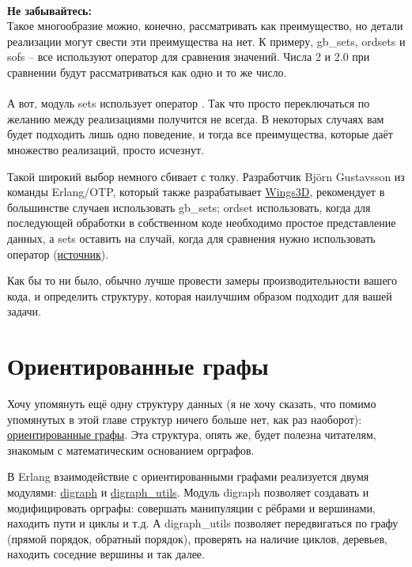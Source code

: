 \\
\colorbox{lorange}
{
    \begin{minipage}{1.0\linewidth}
        \textbf{Не забывайтесь:}\\
        Такое многообразие можно, конечно, рассматривать как преимущество, но детали реализации могут свести эти преимущества на нет.
        К примеру, gb\_sets, ordsets и sofs \--- все используют оператор \ops{==} для сравнения значений.
        Числа 2 и 2.0 при сравнении будут рассматриваться как одно и то же число.\\
        \\
        А вот, модуль sets использует оператор \ops{=:=}.
        Так что просто переключаться по желанию между реализациями получится не всегда.
        В некоторых случаях вам будет подходить лишь одно поведение, и тогда все преимущества, которые даёт множество реализаций, просто исчезнут.
    \end{minipage}
}

Такой широкий выбор немного сбивает с толку.
Разработчик Bj\"{o}rn Gustavsson из команды Erlang/OTP, который также разрабатывает \href{http://www.wings3d.com/}{Wings3D}, рекомендует в большинстве случаев использовать gb\_sets; ordset использовать, когда для последующей обработки в собственном коде необходимо простое представление данных, а sets оставить на случай, когда для сравнения нужно использовать оператор \ops{=:=} (\href{http://erlang.org/pipermail/erlang-questions/2010-March/050332.html}{источник}).

Как бы то ни было, обычно лучше провести замеры производительности вашего кода, и определить структуру, которая наилучшим образом подходит для вашей задачи.
\section{Ориентированные графы}
\label{directed-graphs}
Хочу упомянуть ещё одну структуру данных (я не хочу сказать, что помимо упомянутых в этой главе структур ничего больше нет, как раз наоборот): \href{http://en.wikipedia.org/wiki/Directed\_graph}{ориентированные графы}.
Эта структура, опять же, будет полезна читателям, знакомым с математическим основанием орграфов.

В Erlang взаимодействие с ориентированными графами реализуется двумя модулями: \href{http://erldocs.com/R15B/stdlib/digraph.html}{digraph} и \href{http://erldocs.com/R15B/stdlib/digraph\_utils}{digraph\_utils}.
Модуль digraph позволяет создавать и модифицировать орграфы: совершать манипуляции с рёбрами и вершинами, находить пути и циклы и т.д.
А digraph\_utils позволяет передвигаться по графу (прямой порядок, обратный порядок), проверять на наличие циклов, деревьев, находить соседние вершины и так далее.

